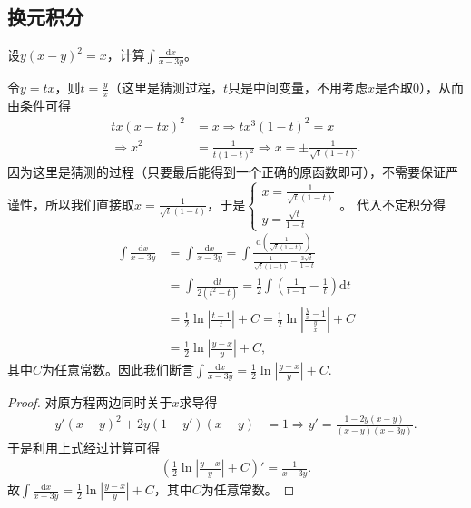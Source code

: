 \documentclass[../../main.tex]{subfiles}
\begin{document}
\subsection{换元积分}

\begin{example}
设\(y(x - y)^2 = x\)，计算\(\int \frac{\mathrm{d}x}{x - 3y}\)。 
\end{example}
\begin{note}
令\(y = tx\)，则\(t = \frac{y}{x}\)（这里是猜测过程，\(t\)只是中间变量，不用考虑\(x\)是否取\(0\)），从而由条件可得
\begin{align*}
tx(x - tx)^2 &= x \Rightarrow tx^3(1 - t)^2 = x\\
\Rightarrow x^2&=\frac{1}{t(1 - t)^2} \Rightarrow x = \pm\frac{1}{\sqrt{t}(1 - t)}.
\end{align*}
因为这里是猜测的过程（只要最后能得到一个正确的原函数即可），不需要保证严谨性，所以我们直接取\(x=\frac{1}{\sqrt{t}(1 - t)}\)，于是\(\begin{cases}
x=\frac{1}{\sqrt{t}(1 - t)}\\
y=\frac{\sqrt{t}}{1 - t}
\end{cases}\)。
代入不定积分得
\begin{align*}
\int{\frac{\mathrm{d}x}{x - 3y}}&=\int{\frac{\mathrm{d}x}{x - 3y}}=\int{\frac{\mathrm{d}\left(\frac{1}{\sqrt{t}(1 - t)}\right)}{\frac{1}{\sqrt{t}(1 - t)}-\frac{3\sqrt{t}}{1 - t}}}\\
&=\int{\frac{\mathrm{d}t}{2(t^2 - t)}}=\frac{1}{2}\int{\left(\frac{1}{t - 1}-\frac{1}{t}\right)\mathrm{d}t}\\
&=\frac{1}{2}\ln\left|\frac{t - 1}{t}\right| + C=\frac{1}{2}\ln\left|\frac{\frac{y}{x}-1}{\frac{y}{x}}\right| + C\\
&=\frac{1}{2}\ln\left|\frac{y - x}{y}\right| + C,
\end{align*}
其中\(C\)为任意常数。因此我们断言\(\int{\frac{\mathrm{d}x}{x - 3y}}=\frac{1}{2}\ln\left|\frac{y - x}{y}\right| + C\).
\end{note}
\begin{proof}
对原方程两边同时关于\(x\)求导得
\begin{align*}
y'(x - y)^2 + 2y(1 - y')(x - y) &= 1 \Rightarrow y'=\frac{1 - 2y(x - y)}{(x - y)(x - 3y)}.
\end{align*}
于是利用上式经过计算可得
\begin{align*}
\left(\frac{1}{2}\ln\left|\frac{y - x}{y}\right| + C\right)'=\frac{1}{x - 3y}.
\end{align*}
故\(\int{\frac{\mathrm{d}x}{x - 3y}}=\frac{1}{2}\ln\left|\frac{y - x}{y}\right| + C\)，其中\(C\)为任意常数。 
\end{proof}
\end{document}
